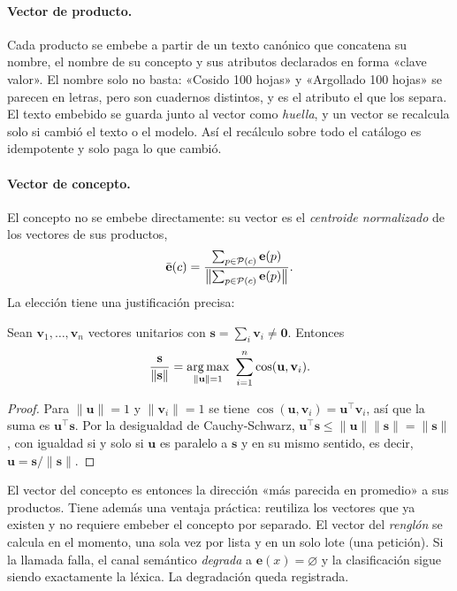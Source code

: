 \paragraph{Vector de producto.} Cada producto se embebe a partir de un texto
canónico que concatena su nombre, el nombre de su concepto y sus atributos
declarados en forma «clave valor». El nombre solo no basta: «Cosido 100 hojas»
y «Argollado 100 hojas» se parecen en letras, pero son cuadernos distintos, y
es el atributo el que los separa. El texto embebido se guarda junto al vector
como \emph{huella}, y un vector se recalcula solo si cambió el texto o el
modelo. Así el recálculo sobre todo el catálogo es idempotente y solo paga
lo que cambió.

\paragraph{Vector de concepto.} El concepto no se embebe directamente: su
vector es el \emph{centroide normalizado} de los vectores de sus productos,
\[
  \bar{\mathbf{e}}(c)=\frac{\sum_{p\in\mathcal{P}(c)}\mathbf{e}(p)}
                           {\bigl\lVert\sum_{p\in\mathcal{P}(c)}\mathbf{e}(p)\bigr\rVert}.
\]
La elección tiene una justificación precisa:

\begin{proposicion}
\label{prop:centroide}
Sean $\mathbf{v}_1,\dots,\mathbf{v}_n$ vectores unitarios con
$\mathbf{s}=\sum_i\mathbf{v}_i\neq\mathbf{0}$. Entonces
\[
  \frac{\mathbf{s}}{\lVert\mathbf{s}\rVert}
  = \argmax_{\lVert\mathbf{u}\rVert=1}\ \sum_{i=1}^{n}\cos(\mathbf{u},\mathbf{v}_i).
\]
\end{proposicion}

\begin{proof}
Para $\lVert\mathbf{u}\rVert=1$ y $\lVert\mathbf{v}_i\rVert=1$ se tiene
$\cos(\mathbf{u},\mathbf{v}_i)=\mathbf{u}^\top\mathbf{v}_i$, así que la suma es
$\mathbf{u}^\top\mathbf{s}$. Por la desigualdad de Cauchy-Schwarz,
$\mathbf{u}^\top\mathbf{s}\leq\lVert\mathbf{u}\rVert\lVert\mathbf{s}\rVert
=\lVert\mathbf{s}\rVert$, con igualdad si y solo si $\mathbf{u}$ es paralelo a
$\mathbf{s}$ y en su mismo sentido, es decir,
$\mathbf{u}=\mathbf{s}/\lVert\mathbf{s}\rVert$.
\end{proof}

El vector del concepto es entonces la dirección «más parecida en promedio» a
sus productos. Tiene además una ventaja práctica: reutiliza los vectores que
ya existen y no requiere embeber el concepto por separado. El vector del
\emph{renglón} se calcula en el momento, una sola vez por lista y en un solo
lote (una petición). Si la llamada falla, el canal semántico
\emph{degrada} a $\mathbf{e}(x)=\varnothing$ y la clasificación sigue siendo
exactamente la léxica. La degradación queda registrada.

